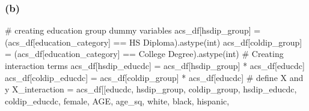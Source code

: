 \documentclass[
  letterpaper,
  DIV=11,
  numbers=noendperiod]{scrartcl}
\newenvironment{Shaded}{\begin{snugshade}}{\end{snugshade}}
\newcommand{\BuiltInTok}[1]{\textcolor[rgb]{0.00,0.23,0.31}{#1}}
\newcommand{\CommentTok}[1]{\textcolor[rgb]{0.37,0.37,0.37}{#1}}
\newcommand{\NormalTok}[1]{\textcolor[rgb]{0.00,0.23,0.31}{#1}}
\newcommand{\OperatorTok}[1]{\textcolor[rgb]{0.37,0.37,0.37}{#1}}
\newcommand{\StringTok}[1]{\textcolor[rgb]{0.13,0.47,0.30}{#1}}
\begin{document}
\subsubsection{(b)}\label{b-1}

\begin{Shaded}
\begin{Highlighting}[]
\CommentTok{\# creating education group dummy variables}
\NormalTok{acs\_df[}\StringTok{\textquotesingle{}hsdip\_group\textquotesingle{}}\NormalTok{] }\OperatorTok{=}\NormalTok{ (acs\_df[}\StringTok{\textquotesingle{}education\_category\textquotesingle{}}\NormalTok{] }\OperatorTok{==} \StringTok{\textquotesingle{}HS Diploma\textquotesingle{}}\NormalTok{).astype(}\BuiltInTok{int}\NormalTok{)}
\NormalTok{acs\_df[}\StringTok{\textquotesingle{}coldip\_group\textquotesingle{}}\NormalTok{] }\OperatorTok{=}\NormalTok{ (acs\_df[}\StringTok{\textquotesingle{}education\_category\textquotesingle{}}\NormalTok{] }\OperatorTok{==}
                          \StringTok{\textquotesingle{}College Degree\textquotesingle{}}\NormalTok{).astype(}\BuiltInTok{int}\NormalTok{)}
\CommentTok{\# Creating interaction terms}
\NormalTok{acs\_df[}\StringTok{\textquotesingle{}hsdip\_educdc\textquotesingle{}}\NormalTok{] }\OperatorTok{=}\NormalTok{ acs\_df[}\StringTok{\textquotesingle{}hsdip\_group\textquotesingle{}}\NormalTok{] }\OperatorTok{*}\NormalTok{ acs\_df[}\StringTok{\textquotesingle{}educdc\textquotesingle{}}\NormalTok{]}
\NormalTok{acs\_df[}\StringTok{\textquotesingle{}coldip\_educdc\textquotesingle{}}\NormalTok{] }\OperatorTok{=}\NormalTok{ acs\_df[}\StringTok{\textquotesingle{}coldip\_group\textquotesingle{}}\NormalTok{] }\OperatorTok{*}\NormalTok{ acs\_df[}\StringTok{\textquotesingle{}educdc\textquotesingle{}}\NormalTok{]}
\CommentTok{\# define X and y}
\NormalTok{X\_interaction }\OperatorTok{=}\NormalTok{ acs\_df[[}\StringTok{\textquotesingle{}educdc\textquotesingle{}}\NormalTok{, }\StringTok{\textquotesingle{}hsdip\_group\textquotesingle{}}\NormalTok{, }\StringTok{\textquotesingle{}coldip\_group\textquotesingle{}}\NormalTok{, }\StringTok{\textquotesingle{}hsdip\_educdc\textquotesingle{}}\NormalTok{, }\StringTok{\textquotesingle{}coldip\_educdc\textquotesingle{}}\NormalTok{,}
                        \StringTok{\textquotesingle{}female\textquotesingle{}}\NormalTok{, }\StringTok{\textquotesingle{}AGE\textquotesingle{}}\NormalTok{, }\StringTok{\textquotesingle{}age\_sq\textquotesingle{}}\NormalTok{, }\StringTok{\textquotesingle{}white\textquotesingle{}}\NormalTok{, }\StringTok{\textquotesingle{}black\textquotesingle{}}\NormalTok{, }\StringTok{\textquotesingle{}hispanic\textquotesingle{}}\NormalTok{,}

\end{Highlighting}
\end{Shaded}
\end{document}
